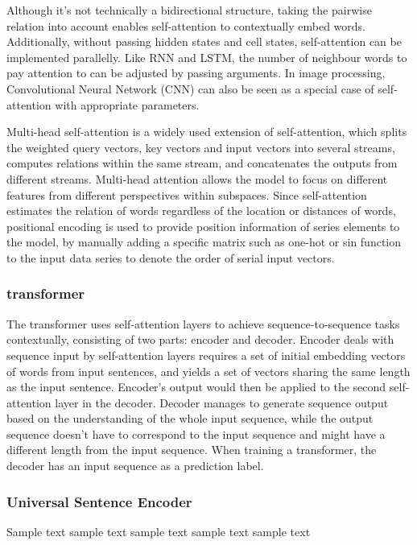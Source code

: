 Although it's not technically a bidirectional structure, taking the pairwise relation into account enables self-attention to contextually embed words.
Additionally, without passing hidden states and cell states, self-attention can be implemented parallelly.
Like RNN and LSTM, the number of neighbour words to pay attention to can be adjusted by passing arguments.
In image processing, Convolutional Neural Network (CNN) can also be seen as a special case of self-attention with appropriate parameters\cite{cordonnier2019relationship}.

Multi-head self-attention is a widely used extension of self-attention, which splits the weighted query vectors, key vectors and input vectors into several streams, computes relations within the same stream, and concatenates the outputs from different streams.
Multi-head attention allows the model to focus on different features from different perspectives within subspaces.
Since self-attention estimates the relation of words regardless of the location or distances of words, positional encoding is used to provide position information of series elements to the model, by manually adding a specific matrix such as one-hot or sin function to the input data series to denote the order of serial input vectors.

\subsubsection{transformer}
The transformer uses self-attention layers to achieve sequence-to-sequence tasks contextually, consisting of two parts: encoder and decoder.
Encoder deals with sequence input by self-attention layers requires a set of initial embedding vectors of words from input sentences, and yields a set of vectors sharing the same length as the input sentence.
Encoder's output would then be applied to the second self-attention layer in the decoder. 
Decoder manages to generate sequence output based on the understanding of the whole input sequence, while the output sequence doesn't have to correspond to the input sequence and might have a different length from the input sequence.
When training a transformer, the decoder has an input sequence as a prediction label.


\subsubsection{Universal Sentence Encoder}
Sample text sample text sample text sample text sample text

